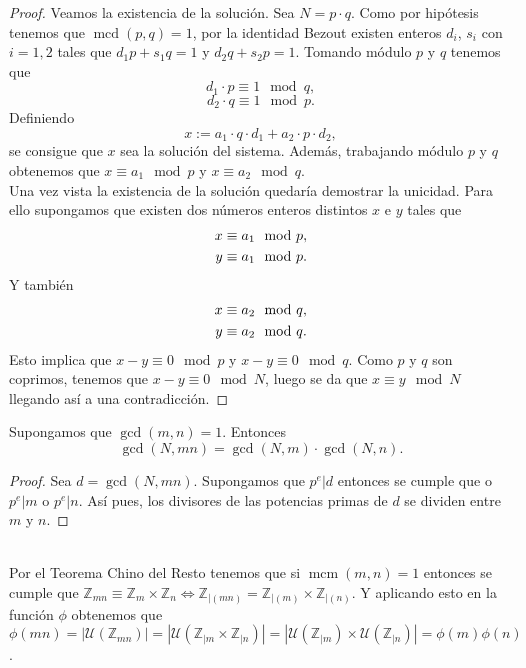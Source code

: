 \begin{proof}
		Veamos la existencia de la solución. Sea $N=p\cdot q$. Como por hipótesis tenemos que $\operatorname{mcd}(p,q)=1$, por la identidad Bezout existen enteros $d_i$, $s_i$ con $i=1,2$ tales que $d_1p+s_1q=1$ y $d_2q+s_2p=1$. Tomando módulo $p$ y $q$ tenemos que 
	$$
		d_1\cdot p \equiv 1 \mod q,
	$$\vspace*{-7mm}
	$$
		d_2\cdot q \equiv 1 \mod p.
	$$
	Definiendo 
	$$
		x :=  a_1\cdot q\cdot d_1 +a_2\cdot p\cdot d_2,
	$$
	se consigue que $x$ sea la solución del sistema. Además, trabajando módulo $p$ y $q$ obtenemos que $x\equiv a_1 \mod p$ y $x\equiv a_2 \mod q$.\\
	Una vez vista la existencia de la solución quedaría demostrar la unicidad. Para ello supongamos que existen dos números enteros distintos $x$ e $y$ tales que 
		\begin{equation}
			\begin{split}
				x \equiv a_1 \mod p,\notag\\
				y \equiv a_1 \mod p.\notag
			\end{split}
		\end{equation}
	Y también 
		\begin{equation}
			\begin{split}
				x \equiv a_2 \mod q,\notag\\
				y \equiv a_2 \mod q.\notag
			\end{split}
		\end{equation}
	Esto implica que $x-y\equiv0 \mod p$ y $x-y\equiv0 \mod q$. Como $p$ y $q$ son coprimos, tenemos que $x-y\equiv 0 \mod N$, luego se da que $x\equiv y \mod N$ llegando así a una contradicción. \qedhere
\end{proof}

\begin{proposicion}
		Supongamos que $\operatorname{gcd}(m,n)=1$. Entonces
		$$
			\operatorname{gcd}(N, mn)=\operatorname{gcd}(N,m)\cdot\operatorname{gcd}(N,n).
		$$
\end{proposicion}
\begin{proof}
		Sea $d=\operatorname{gcd}(N,mn)$. Supongamos que $p^e|d$ entonces se cumple que o $p^e|m$ o $p^e|n$. Así pues, los divisores de las potencias primas de $d$ se dividen entre $m$ y $n$.
\end{proof}\\

Por el Teorema Chino del Resto tenemos que si $\operatorname{mcm}(m,n)=1$ entonces se cumple que $\mathbb{Z}_{mn}\equiv \mathbb{Z}_m\times\mathbb{Z}_n \Leftrightarrow \mathbb{Z}_{|(mn)}=\mathbb{Z}_{|(m)}\times\mathbb{Z}_{|(n)}$. Y aplicando esto en la función $\phi$ obtenemos que $\phi(mn)=|\mathcal{U}(\mathbb{Z}_{mn})|=|\mathcal{U}(\mathbb{Z}_{|m}\times\mathbb{Z}_{|n})|=|\mathcal{U}(\mathbb{Z}_{|m})\times\mathcal{U}(\mathbb{Z}_{|n})|=\phi(m)\phi(n)$.

